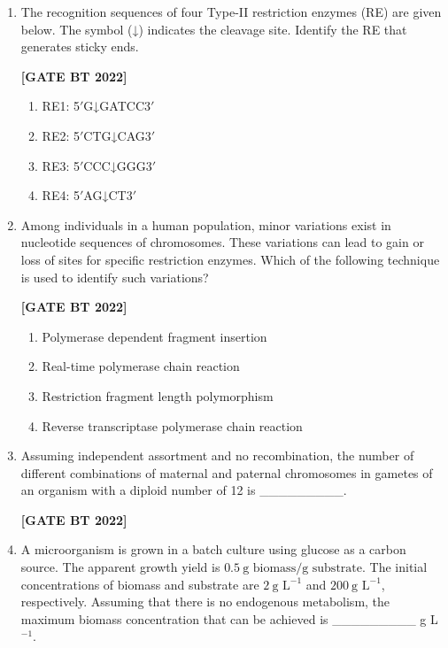 \documentclass[12pt]{article}
\begin{document}
\begin{enumerate}[leftmargin=2.5em, label=\textbf{Q.\arabic*}., itemsep=2em, resume]

\item The recognition sequences of four Type-II restriction enzymes (RE) are given below.  
The symbol (↓) indicates the cleavage site. Identify the RE that generates sticky ends.  

\noindent \textbf{[GATE BT 2022]}
\begin{multicols}{2}
\begin{enumerate}
    \item RE1: 5$'$G↓GATCC3$'$
    \item RE2: 5$'$CTG↓CAG3$'$
    \item RE3: 5$'$CCC↓GGG3$'$
    \item RE4: 5$'$AG↓CT3$'$
\end{enumerate}
\end{multicols}

\item Among individuals in a human population, minor variations exist in nucleotide sequences of chromosomes.  
These variations can lead to gain or loss of sites for specific restriction enzymes.  
Which of the following technique is used to identify such variations?

\noindent \textbf{[GATE BT 2022]}
\begin{multicols}{2}
\begin{enumerate}
    \item Polymerase dependent fragment insertion
    \item Real-time polymerase chain reaction
    \item Restriction fragment length polymorphism
    \item Reverse transcriptase polymerase chain reaction
\end{enumerate}
\end{multicols}

\item Assuming independent assortment and no recombination, the number of different combinations of maternal and paternal chromosomes in gametes of an organism with a diploid number of 12 is \_\_\_\_\_\_\_\_\_.

\noindent \textbf{[GATE BT 2022]}

\item A microorganism is grown in a batch culture using glucose as a carbon source.  
The apparent growth yield is $0.5~\text{g biomass/g substrate}$.  
The initial concentrations of biomass and substrate are $2~\text{g L}^{-1}$ and $200~\text{g L}^{-1}$, respectively.  
Assuming that there is no endogenous metabolism, the maximum biomass concentration that can be achieved is \_\_\_\_\_\_\_\_\_ g L$^{-1}$.


\end{enumerate}
\end{document}
